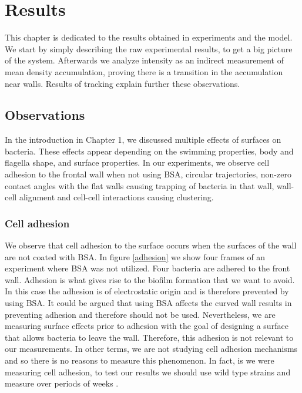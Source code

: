 \chapter{Results}

This chapter is dedicated to the results obtained in experiments and the model. We start by simply describing the raw experimental results, to get a big picture of the system. Afterwards we analyze intensity as an indirect measurement of mean density accumulation, proving there is a transition in the accumulation near walls. Results of tracking explain further these observations.  


\section{Observations}

In the introduction in Chapter 1, we discussed multiple effects of surfaces on bacteria. These effects appear depending on the swimming properties, body and flagella shape, and surface properties. In our experiments, we observe cell adhesion to the frontal wall when not using BSA, circular trajectories, non-zero contact angles with the flat walls causing trapping of bacteria in that wall, wall-cell alignment and cell-cell interactions causing clustering.

\subsection{Cell adhesion}


We observe that cell adhesion to the surface occurs when the surfaces of the wall are not coated with BSA. In figure \ref{adhesion} we show four frames of an experiment where BSA was not utilized. Four bacteria are adhered to the front wall. Adhesion is what gives rise to the biofilm formation that we want to avoid. In this case the adhesion is of electrostatic origin and is therefore prevented by using BSA. It could be argued that using BSA affects the curved wall results in preventing adhesion and therefore should not be used. Nevertheless, we are measuring surface effects prior to adhesion with the goal of designing a surface that allows bacteria to leave the wall. Therefore, this adhesion is not relevant to our measurements. In other terms, we are not studying cell adhesion mechanisms and so there is no reasons to measure this phenomenon. In fact, is we were measuring cell adhesion, to test our results we should use wild type strains and measure over periods of weeks \cite{Costerton1987BacterialDisease.}. 

